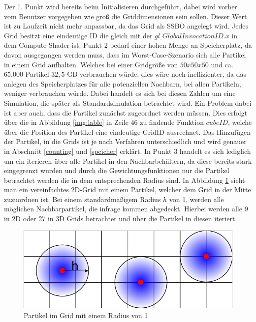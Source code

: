 \documentclass[intern,palatino]{cgBA}
\begin{document}
Der 1. Punkt wird bereits beim Initialisieren durchgeführt, dabei wird vorher vom Benutzer vorgegeben wie groß die Griddimensionen sein sollen. Dieser Wert ist zu Laufzeit nicht mehr anpassbar, da das Grid als SSBO angelegt wird. Jedes Grid besitzt eine eindeutige ID die gleich mit der $gl\_GlobalInvocationID.x$ in dem Compute-Shader ist. 
\newline
Punkt 2 bedarf einer hohen Menge an Speicherplatz, da davon ausgegangen werden muss, dass im Worst-Case-Szenario sich alle Partikel in einem Grid aufhalten. Welches bei einer Gridgröße von $50x50x50$ und ca. $65.000$ Partikel $32,5$ GB verbrauchen würde, dies wäre noch ineffizienter, da das anlegen des Speicherplatzes für alle potenziellen Nachbarn, bei allen Partikeln, weniger verbrauchen würde. Dabei handelt es sich bei diesen Zahlen um eine Simulation, die später als Standardsimulation betrachtet wird.
\newline
Ein Problem dabei ist aber auch, dass die Partikel zunächst zugeordnet werden müssen. Dies erfolgt über die in Abbildung \ref{img:lable} in Zeile 46 zu findende Funktion $cubeID$, welche über die Position des Partikel eine eindeutige GridID ausrechnet. Das Hinzufügen der Partikel, in die Grids ist je nach Verfahren unterschiedlich und wird genauer in Abschnitt \ref{counting} und \ref{speicher}  erklärt.
\newline
In Punkt 3 handelt es sich lediglich um ein iterieren über alle Partikel in den Nachbarbehältern, da diese bereits stark eingegrenzt wurden und durch die Gewichtungsfunktionen nur die Partikel betrachtet werden die in dem entsprechenden Radius sind.
\newline
In Abbildung \ref{img:grid} sieht man ein vereinfachtes 2D-Grid mit einem Partikel, welcher dem Grid in der Mitte zuzuordnen ist. Bei einem standardmäßigem Radius $h$ von 1, werden alle möglichen Nachbarpartikel, die infrage kommen abgedeckt. Hierbei werden alle 9 in 2D oder 27 in 3D Grids betrachtet und über die Partikel in diesen iteriert.

\begin{figure}[H]
	\centering
	\includegraphics[width=1\columnwidth]{Bilder/grid.jpg}
	\caption{Partikel im Grid mit einem Radius von 1}
	\label{img:grid}
\end{figure}
\end{document}
